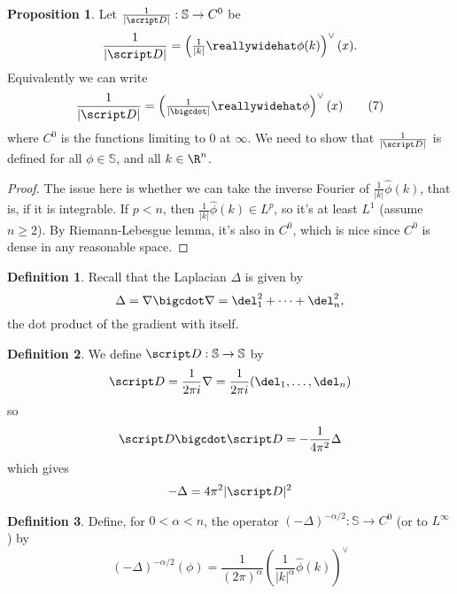\documentclass[a5paper]{article}
\theoremstyle{definition}%
\newtheorem{proposition}[theorem]{Proposition}
\newtheorem*{definition*}{Definition}
\numberwithin{exercise}{section}
\theoremstyle{remark}%
\renewcommand{\S}{\mathbb{S}}
\renewcommand{\L}{L}
\begin{document}
\begin{highlight}
\begin{proposition}
Let $\frac{1}{|\D|}:\S\to C^0$ be
\begin{equation}
\frac{1}{|\D|}=\left(\tfrac{1}{|k|}\hat{\phi}(k)\right)^\vee(x).
\end{equation}
Equivalently we can write 
\begin{equation}
\frac{1}{|\D|}=\left(\tfrac{1}{|\bigcdot|}\hat{\phi}\right)^\vee(x)\tag{$7$}
\end{equation}
where $C^0$ is the functions limiting to 0 at $\infty$. We need to show that $\frac{1}{|\D|}$ is defined for all $\phi\in\S$, and all $k\in\R^n$. 
\end{proposition}
\end{highlight}
\begin{proof}
The issue here is whether we can take the inverse Fourier of $\tfrac{1}{|k|}\hat{\phi}(k)$, that is, if it is integrable. If $p<n$, then $\tfrac{1}{|k|}\hat{\phi}(k)\in\L^p$, so it's at least $L^1$ (assume $n\geq 2$). By Riemann-Lebesgue lemma, it's also in $C^0$, which is nice since $C^0$ is dense in any reasonable space. 
\end{proof}

\pagebreak
\newcommand{\laplacian}{\Delta}
\begin{highlight}
\begin{definition*}
Recall that the Laplacian $\laplacian$ is given by 
$$\laplacian=\nabla\cdot \nabla=\del_1^2+\dots+\del_n^2,$$
the dot product of the gradient with itself. 
\end{definition*}
\end{highlight}

\begin{highlight}
\begin{definition*}
We define $\D:\S\to\S$ by 
\begin{equation}
\D=\frac{1}{2\pi i}\nabla=\frac{1}{2\pi i}(\del_1, \dots, \del_n)
\end{equation}
so 
\begin{equation}
\D\cdot\D=-\frac{1}{4\pi^2}\laplacian
\end{equation}
which gives 
\begin{equation}
-\laplacian=4\pi^2|\D|^2
\end{equation}
\end{definition*}
\end{highlight}

\begin{highlight}
\begin{definition*}
Define, for $0<\alpha<n$, the operator $(-\laplacian)^{-\alpha/2}:\S\to C^0$ (or to $L^\infty$) by 
\begin{equation}
(-\laplacian)^{-\alpha/2}(\phi)=\frac{1}{(2\pi)^\alpha}\left(\frac{1}{|k|^\alpha} \hat{\phi}(k)\right)^\vee
\end{equation}
\end{definition*}
\end{highlight}
\end{document}
